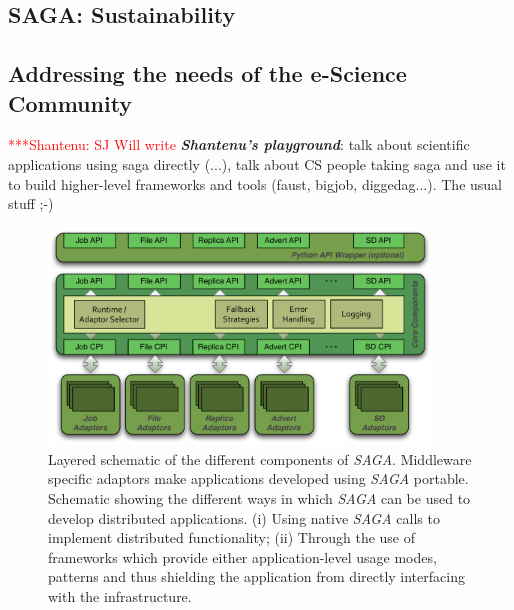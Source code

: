 \documentclass[a4paper,10pt]{article}
\newcommand{\BI}[1]{\textbf{\textit{#1}}}
\newcommand{\sagaimpl}{\textit{SAGA}\xspace}
\newcommand{\impl}{\sagaimpl}
\newcommand{\jhanote}[1]{  {\textcolor{red}     { ***Shantenu: #1 }}}
\newcommand{\jhanote}[1]{}
\begin{document}

\subsection*{SAGA: Sustainability}

\subsection*{Addressing the needs of the e-Science Community}
\jhanote{SJ Will write} \BI{Shantenu's playground}: talk about
scientific applications using saga directly (...), talk about CS
people taking saga and use it to build higher-level frameworks and
tools (faust, bigjob, diggedag...). The usual stuff ;-)

\pagebreak

\begin{figure}[hb]
  \centering
  \includegraphics[width=4in]{./figures/saga-architecture}
 \vspace{-1em}	
  \caption{\footnotesize Layered schematic of the different
    components of \impl.  Middleware specific adaptors make
    applications developed using \impl portable.  Schematic showing
    the different ways in which \impl can be used to develop
    distributed applications. (i) Using native \impl calls to
    implement distributed functionality; (ii) Through the use of
    frameworks which provide either application-level usage modes,
    patterns and thus shielding the application from directly
    interfacing with the infrastructure.}
  \label{fig:saga_arch}
\end{figure}

  
 
\end{document}
